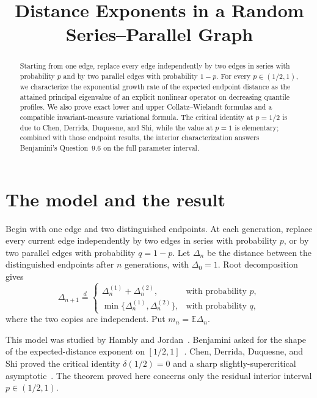 \documentclass[a4paper,11pt]{amsart}
\title[Distance exponents]{Distance Exponents in a Random Series--Parallel Graph}
\date{}
\theoremstyle{remark}
\begin{document}
\begin{abstract}
Starting from one edge, replace every edge independently by two edges in series with probability $p$ and by two parallel edges with probability $1-p$.  For every $p\in(1/2,1)$, we characterize the exponential growth rate of the expected endpoint distance as the attained principal eigenvalue of an explicit nonlinear operator on decreasing quantile profiles.  We also prove exact lower and upper Collatz--Wielandt formulas and a compatible invariant-measure variational formula.  The critical identity at $p=1/2$ is due to Chen, Derrida, Duquesne, and Shi, while the value at $p=1$ is elementary; combined with those endpoint results, the interior characterization answers Benjamini's Question~9.6 on the full parameter interval.
\end{abstract}

\maketitle

\section{The model and the result}

Begin with one edge and two distinguished endpoints. At each generation, replace every current edge independently by two edges in series with probability $p$, or by two parallel edges with probability $q=1-p$. Let $\Delta_n$ be the distance between the distinguished endpoints after $n$ generations, with $\Delta_0=1$. Root decomposition gives
\begin{equation}\label{eq:recursion}
 \Delta_{n+1}\mathrel{\overset d=}
 \begin{cases}
  \Delta_n^{(1)}+\Delta_n^{(2)},&\text{with probability }p,\\
  \min\{\Delta_n^{(1)},\Delta_n^{(2)}\},&\text{with probability }q,
 \end{cases}
\end{equation}
where the two copies are independent. Put $m_n=\mathbb E\Delta_n$.

This model was studied by Hambly and Jordan~\cite{HamblyJordan2004}. Benjamini asked for the shape of the expected-distance exponent on $[1/2,1]$~\cite[Question~9.6]{Benjamini2013}. Chen, Derrida, Duquesne, and Shi proved the critical identity $\delta(1/2)=0$ and a sharp slightly-supercritical asymptotic~\cite{ChenEtAl2026}. The theorem proved here concerns only the residual interior interval $p\in(1/2,1)$.
\end{document}

